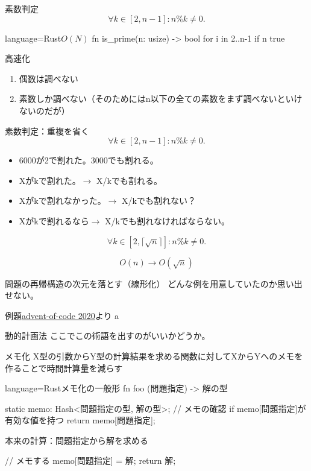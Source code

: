 \documentclass{beamer}
\begin{document}
\begin{frame}[fragile]{素数判定}{}
\[
\forall k \in [2, n-1] : n \% k \ne 0.
\]

\begin{codeof}{language=Rust}{$O(N)$}
fn is_prime(n: usize) -> bool {
    for i in 2..n-1 {
        if n %
    }
    true
}
\end{codeof}
高速化
\begin{enumerate}%
\item 偶数は調べない
\item 素数しか調べない（そのためにはn以下の全ての素数をまず調べないといけないのだが）
\end{enumerate}
\end{frame}

\begin{frame}[fragile]{素数判定：重複を省く}{}
\[
\forall k \in [2, n-1] : n \% k \ne 0.
\]

\begin{itemize}%
\item 6000が2で割れた。3000でも割れる。
\item Xがkで割れた。$\to$ X/kでも割れる。
\item Xがkで割れなかった。$\to$ X/kでも割れない？
\item Xがkで割れるなら$\to$ X/kでも割れなければならない。
\end{itemize}

\[
\forall k \in [2, \lceil\sqrt{n}\rceil] : n \% k \ne 0.
\]

\[
O(n) \to O(\sqrt{n})
\]
\end{frame}

\begin{frame}[fragile]{問題の再帰構造の次元を落とす（線形化）}{}
どんな例を用意していたのか思い出せない。
\end{frame}

\begin{frame}[fragile]{例題}{\href{}{advent-of-code 2020}より}
a
\end{frame}

\begin{frame}[fragile]{動的計画法}{}
ここでこの術語を出すのがいいかどうか。
\end{frame}

\begin{frame}[fragile]{メモ化}{\href{https://ja.wikipedia.org/wiki/メモ化}{}}
X型の引数からY型の計算結果を求める関数に対してXからYへのメモを作ることで時間計算量を減らす
\begin{codeof}{language=Rust}{メモ化の一般形}
fn foo (問題指定) -> 解の型 {
  static memo: Hash<問題指定の型, 解の型>;
  // メモの確認
  if memo[問題指定]が有効な値を持つ {
    return memo[問題指定];
  }

   本来の計算：問題指定から解を求める

  // メモする
  memo[問題指定] = 解;
  return 解;
}
\end{codeof}

\end{frame}
\end{document}
